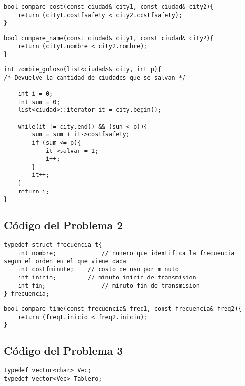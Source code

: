 \documentclass[a4paper]{article}
\begin{document}
\vspace*{0.5cm}

\begin{lstlisting}
bool compare_cost(const ciudad& city1, const ciudad& city2){
	return (city1.costfsafety < city2.costfsafety);
}
\end{lstlisting}

\vspace*{0.5cm}

\begin{lstlisting}
bool compare_name(const ciudad& city1, const ciudad& city2){
	return (city1.nombre < city2.nombre);
}
\end{lstlisting}

\vspace*{0.5cm}

\begin{lstlisting}
int zombie_goloso(list<ciudad>& city, int p){
/* Devuelve la cantidad de ciudades que se salvan */

	int i = 0;
	int sum = 0;
	list<ciudad>::iterator it = city.begin();
    
    while(it != city.end() && (sum < p)){
		sum = sum + it->costfsafety;
		if (sum <= p){
			it->salvar = 1;
			i++;
		}
		it++;
	}
	return i;
}
\end{lstlisting}

\newpage
\subsection{Código del Problema 2}

\begin{lstlisting}
typedef struct frecuencia_t{
	int nombre; 			// numero que identifica la frecuencia segun el orden en el que viene dada
	int costfminute;  	// costo de uso por minuto
    int inicio;			// minuto inicio de transmision
    int fin;				// minuto fin de transmision
} frecuencia;
\end{lstlisting}

\vspace*{0.5cm}

\begin{lstlisting}
bool compare_time(const frecuencia& freq1, const frecuencia& freq2){
	return (freq1.inicio < freq2.inicio);
}
\end{lstlisting}


\newpage
\subsection{Código del Problema 3}

\begin{lstlisting}
typedef vector<char> Vec;
typedef vector<Vec> Tablero;
\end{lstlisting}


\end{document}
